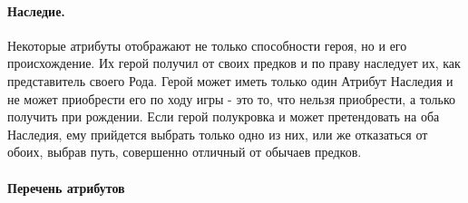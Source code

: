 \paragraph{Наследие.} Некоторые атрибуты отображают не только способности героя, но и его происхождение. Их герой получил от своих предков и по праву наследует их, как представитель своего Рода. Герой может иметь только один Атрибут Наследия и не может приобрести его по ходу игры - это то, что нельзя приобрести, а только получить при рождении. Если герой полукровка и может претендовать на оба Наследия, ему прийдется выбрать только одно из них, или же отказаться от обоих, выбрав путь, совершенно отличный от обычаев предков.

\paragraph{Перечень атрибутов}
